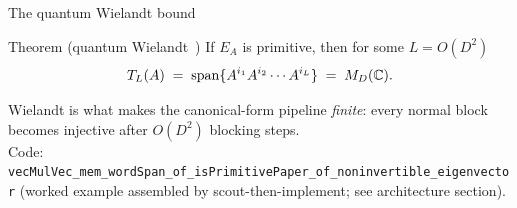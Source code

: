 \documentclass[aspectratio=169,10pt]{beamer}
\begin{document}
\begin{frame}{The quantum Wielandt bound}
    \begin{block}{Theorem (quantum Wielandt~\cite{Sanz2010Quantum})}
        If $E_A$ is primitive, then for some $L = O(D^2)$
        \[
            T_L(A) \;=\; \mathrm{span}\{A^{i_1} A^{i_2} \cdots A^{i_L}\} \;=\; M_D(\mathbb{C}) .
        \]
    \end{block}
    \vspace{0.4em}
    Wielandt is what makes the canonical-form pipeline \emph{finite}: every normal block becomes injective after $O(D^2)$ blocking steps.
    \vspace{0.4em}
    \\
    \textcolor{dimwhite}{\footnotesize Code: \texttt{vecMulVec\_mem\_wordSpan\_of\_isPrimitivePaper\_of\_noninvertible\_eigenvector} (worked example assembled by scout-then-implement; see architecture section).}
\end{frame}
\end{document}
